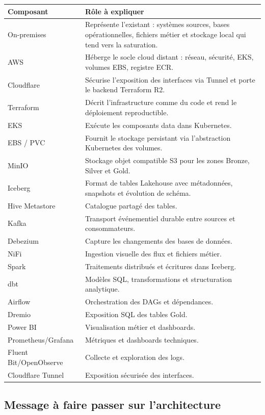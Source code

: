 \documentclass[11pt,a4paper]{article}
\begin{document}
\begin{tabularx}{\textwidth}{@{}p{}X@{}}
\toprule
\textbf{Composant} & \textbf{Rôle à expliquer} \\
\midrule
On-premises & Représente l'existant : systèmes sources, bases opérationnelles, fichiers métier et stockage local qui tend vers la saturation. \\
AWS & Héberge le socle cloud distant : réseau, sécurité, EKS, volumes EBS, registre ECR. \\
Cloudflare & Sécurise l'exposition des interfaces via Tunnel et porte le backend Terraform R2. \\
Terraform & Décrit l'infrastructure comme du code et rend le déploiement reproductible. \\
EKS & Exécute les composants data dans Kubernetes. \\
EBS / PVC & Fournit le stockage persistant via l'abstraction Kubernetes des volumes. \\
MinIO & Stockage objet compatible S3 pour les zones Bronze, Silver et Gold. \\
Iceberg & Format de tables Lakehouse avec métadonnées, snapshots et évolution de schéma. \\
Hive Metastore & Catalogue partagé des tables. \\
Kafka & Transport événementiel durable entre sources et consommateurs. \\
Debezium & Capture les changements des bases de données. \\
NiFi & Ingestion visuelle des flux et fichiers métier. \\
Spark & Traitements distribués et écritures dans Iceberg. \\
dbt & Modèles SQL, transformations et structuration analytique. \\
Airflow & Orchestration des DAGs et dépendances. \\
Dremio & Exposition SQL des tables Gold. \\
Power BI & Visualisation métier et dashboards. \\
Prometheus/Grafana & Métriques et dashboards techniques. \\
Fluent Bit/OpenObserve & Collecte et exploration des logs. \\
Cloudflare Tunnel & Exposition sécurisée des interfaces. \\
\bottomrule
\end{tabularx}

\subsection{Message à faire passer sur l'architecture}
\end{document}
